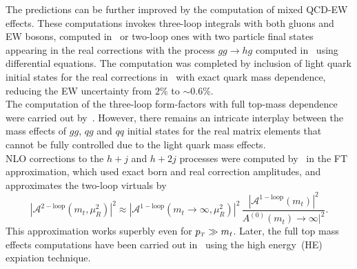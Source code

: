 The predictions can be further improved by the computation of mixed QCD-EW effects. These computations invokes three-loop integrals with both gluons and EW bosons, computed in~\cite{Bonetti:2017ovy} or two-loop ones with two particle final states appearing in the real corrections with the process $ gg \to hg$ computed in~\cite{Bonetti:2020hqh} using differential equations. The computation was completed by inclusion of light quark initial states for the real corrections in~\cite{Becchetti:2020wof} with exact quark mass dependence, reducing the EW uncertainty from $2\%$ to $ \sim 0.6\%$.  \\ The computation of the three-loop form-factors with full top-mass dependence  were carried out by~\cite{Czakon:2020vql,Czakon:2021yub}. However, there remains an intricate interplay between the mass effects of $gg$, $qg$ and $qq$ initial states for the real matrix elements that cannot be fully controlled due to the light quark mass effects. \\ NLO corrections to the $h +j$ and $ h+2j$ processes were computed by~\cite{Maltoni:2014eza} in the FT approximation, which used exact born and real correction amplitudes, and approximates the two-loop virtuals by
\begin{equation}
	|	\mathcal A^{\mathrm{2-loop}}(m_t,\mu_R^2) |^2 \approx  |	\mathcal A^{\mathrm{1-loop}}(m_t\to \infty,\mu_R^2) |^2\, \frac{|	\mathcal A^{\mathrm{1-loop}}(m_t) |^2}{A^{\mathrm{(0)}}(m_t)\to \infty |^2}. 
\end{equation}
This approximation works superbly even for $ p_{\scriptscriptstyle T} \gg m_t$. Later, the full top mass effects computations have been carried out in~\cite{Kudashkin:2017skd, Lindert:2018iug, PhysRevLett.120.162001} using the high energy~(HE) expiation technique. 
